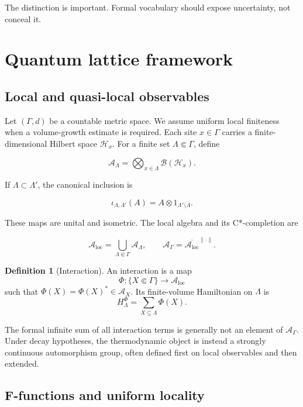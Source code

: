 \documentclass[12pt]{article}
\theoremstyle{definition}
\newtheorem{definition}[theorem]{Definition}
\theoremstyle{remark}
\newcommand{\A}{\mathcal A}
\begin{document}
The distinction is important. Formal vocabulary should expose uncertainty,
not conceal it.

\section{Quantum lattice framework}

\subsection{Local and quasi-local observables}

Let $(\Gamma,d)$ be a countable metric space. We assume uniform local
finiteness when a volume-growth estimate is required. Each site $x\in\Gamma$
carries a finite-dimensional Hilbert space $\mathcal H_x$. For a finite set
$\Lambda\Subset\Gamma$, define

\[
\A_\Lambda
=
\bigotimes_{x\in\Lambda}\mathcal B(\mathcal H_x).
\]

If $\Lambda\subset\Lambda'$, the canonical inclusion is

\[
\iota_{\Lambda,\Lambda'}(A)=A\otimes 1_{\Lambda'\setminus\Lambda}.
\]

These maps are unital and isometric. The local algebra and its C*-completion
are

\[
\A_{\mathrm{loc}}
=
\bigcup_{\Lambda\Subset\Gamma}\A_\Lambda,
\qquad
\A_\Gamma
=
\overline{\A_{\mathrm{loc}}}^{\|\cdot\|}.
\]

\begin{definition}[Interaction]
An interaction is a map
\[
\Phi:\{X\Subset\Gamma\}\longrightarrow\A_{\mathrm{loc}}
\]
such that $\Phi(X)=\Phi(X)^*\in\A_X$. Its finite-volume Hamiltonian on
$\Lambda$ is
\[
H^\Phi_\Lambda=\sum_{X\subseteq\Lambda}\Phi(X).
\]
\end{definition}

The formal infinite sum of all interaction terms is generally not an element
of $\A_\Gamma$. Under decay hypotheses, the thermodynamic object is instead a
strongly continuous automorphism group, often defined first on local
observables and then extended.

\subsection{F-functions and uniform locality}
\end{document}
